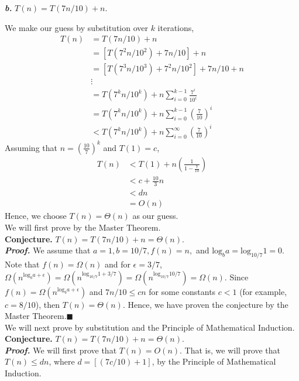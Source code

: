 \documentclass{article}
\begin{document}
\textit{\textbf{b.}} $T(n) = T(7n / 10) + n$.
\begin{adjustwidth}{2.5em}{0pt}
We make our guess by substitution over $k$ iterations,
\begin{align*}
T(n) &= T(7n / 10) + n\\
&= [T(7^2n / 10^2) + 7n/10] + n\\
&= [T(7^3n / 10^3) + 7^2n/10^2] + 7n/10 + n\\
&\vdots\\
&= T(7^kn / 10^k) + n\sum_{i=0}^{k - 1} \frac{7^i}{10^i}\\
&= T(7^kn / 10^k) + n\sum_{i=0}^{k - 1} (\frac{7}{10})^i\\
&< T(7^kn / 10^k) + n\sum_{i=0}^{\infty} (\frac{7}{10})^i
\end{align*}
Assuming that $n = (\frac{10}{7})^k$ and $T(1) = c$,
\begin{align*}
T(n) &< T(1) + n(\frac{1}{1 - \frac{7}{10}})\\
&< c + \frac{10}{3}n\\
&< dn\\
&= O(n)
\end{align*}
Hence, we choose $T(n) = \Theta(n)$ as our guess.\\

We will first prove by the Master Theorem.\\
\textbf{Conjecture.} $T(n) = T(7n / 10) + n = \Theta(n)$.\\
\textit{\textbf{Proof.}} We assume that $a = 1, b = 10 / 7, f(n) = n,$ and $\text{log}_b a = \text{log}_{10 / 7} 1 = 0$. Note that $f(n) = \Omega(n)$ and for $\epsilon = 3 / 7$, $\Omega(n^{\text{log}_b a + \epsilon}) = \Omega(n^{\text{log}_{10 / 7} 1 + 3 / 7}) = \Omega(n^{\text{log}_{10 / 7} 10 / 7}) = \Omega(n)$. Since $f(n) = \Omega(n^{\text{log}_b a + \epsilon})$ and $7n / 10 \leq cn$ for some constants $c < 1$ (for example, $c = 8 / 10$), then $T(n) = \Theta(n)$. Hence, we have proven the conjecture by the Master Theorem.\hfill$\blacksquare$\\

We will next prove by substitution and the Principle of Mathematical Induction.\\
\textbf{Conjecture.} $T(n) = T(7n / 10) + n = \Theta(n)$.\\
\textit{\textbf{Proof.}} We will first prove that $T(n) = O(n).$ That is, we will prove that $T(n) \leq dn$, where $d = [(7c/10) + 1]$, by the Principle of Mathematical Induction.\\


\end{adjustwidth}
\end{document}
